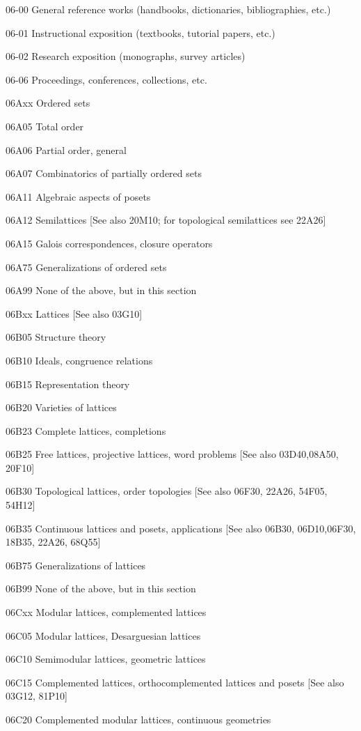 \documentclass[12pt]{article}
\theoremstyle{plain}
\theoremstyle{definition}
\numberwithin{equation}{section}
\begin{document}
06-00 General reference works (handbooks, dictionaries, bibliographies, etc.)

06-01 Instructional exposition (textbooks, tutorial papers, etc.)

06-02 Research exposition (monographs, survey articles)

06-06 Proceedings, conferences, collections, etc.

06Axx Ordered sets

06A05 Total order

06A06 Partial order, general

06A07 Combinatorics of partially ordered sets

06A11 Algebraic aspects of posets

06A12 Semilattices [See also 20M10; for topological semilattices see 22A26]

06A15 Galois correspondences, closure operators

06A75 Generalizations of ordered sets

06A99 None of the above, but in this section

06Bxx Lattices [See also 03G10]

06B05 Structure theory

06B10 Ideals, congruence relations

06B15 Representation theory

06B20 Varieties of lattices

06B23 Complete lattices, completions

06B25 Free lattices, projective lattices, word problems [See also 03D40,08A50, 20F10]

06B30 Topological lattices, order topologies [See also 06F30, 22A26, 54F05, 54H12]

06B35 Continuous lattices and posets, applications [See also 06B30, 06D10,06F30, 18B35, 22A26, 68Q55]

06B75 Generalizations of lattices

06B99 None of the above, but in this section

06Cxx Modular lattices, complemented lattices

06C05 Modular lattices, Desarguesian lattices

06C10 Semimodular lattices, geometric lattices

06C15 Complemented lattices, orthocomplemented lattices and posets [See also 03G12, 81P10]

06C20 Complemented modular lattices, continuous geometries
\end{document}
